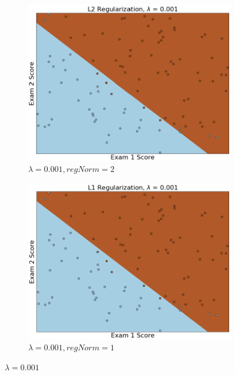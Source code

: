 \documentclass{article}
\begin{document}
\begin{enumerate}
    	\begin{figure}[h!]
     	\centering
     	\begin{subfigure}[b]{0.44\textwidth}
         	\centering
         	\includegraphics[width=\textwidth]
         	{Problem_1_3/fig_L2_2.png}
         	\caption{$\lambda = 0.001, regNorm = 2$}
         	\label{fig:L2_2}
     	\end{subfigure}
     	\hfill
     	\begin{subfigure}[b]{0.44\textwidth}
         	\centering
         	\includegraphics[width=\textwidth]
         	{Problem_1_3/fig_L1_2.png}
         	\caption{$\lambda = 0.001, regNorm = 1$}
         	\label{fig:L1_2}
     	\end{subfigure}
     	\caption{$\lambda=0.001$}
		\end{figure}
		

\end{enumerate}
\end{document}
